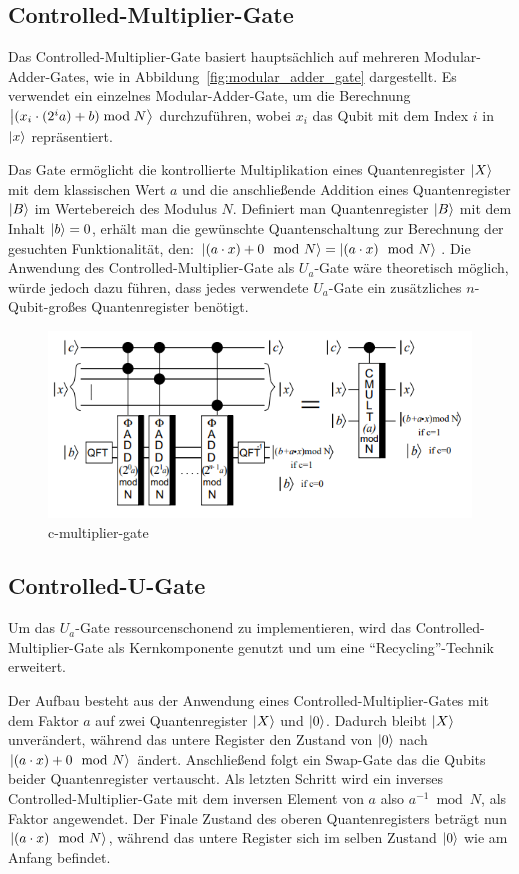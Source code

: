 \documentclass[a4paper,journal]{IEEEtran}
\begin{document}
\subsection{Controlled-Multiplier-Gate}
Das Controlled-Multiplier-Gate basiert hauptsächlich auf mehreren Modular-Adder-Gates,
wie in Abbildung~\ref{fig:modular_adder_gate} dargestellt.
Es verwendet ein einzelnes Modular-Adder-Gate,
um die Berechnung \(\ket{(x_i\cdot(2^ia)+b) \bmod N}\) durchzuführen,
wobei \(x_i\) das Qubit mit dem Index \(i\) in \(\ket{x}\) repräsentiert.

Das Gate ermöglicht die kontrollierte Multiplikation
eines Quantenregister \(\ket{X}\) mit dem klassischen Wert \(a\) und
die anschließende Addition eines Quantenregister \(\ket{B}\) im Wertebereich des Modulus \(N\).
Definiert man Quantenregister \(\ket{B}\) mit dem Inhalt \(\ket{b} = 0\),
erhält man die gewünschte Quantenschaltung zur Berechnung der gesuchten Funktionalität, den:
\(\ket{(a \cdot x) + 0\mod N} = \ket{(a \cdot x)\mod N}\).
Die Anwendung des Controlled-Multiplier-Gate als \(U_a\)-Gate wäre theoretisch möglich,
würde jedoch dazu führen, dass jedes verwendete \(U_a\)-Gate ein
zusätzliches \(n\)-Qubit-großes Quantenregister benötigt.
\begin{figure}[!h]
\caption{c-multiplier-gate~\cite{beauregard2003circuit}}
\label{fig:c-multiplier-gate}
\includegraphics[width=\linewidth]{c-multiplier-gate.PNG}
\centering
\end{figure}

\subsection{Controlled-U-Gate}
Um das \(U_a\)-Gate ressourcenschonend zu implementieren,
wird das Controlled-Multiplier-Gate als Kernkomponente genutzt und um eine "`Recycling"'-Technik erweitert.

Der Aufbau besteht aus der Anwendung eines Controlled-Multiplier-Gates
mit dem Faktor \(a\) auf zwei Quantenregister \(\ket{X}\) und \(\ket{0}\).
Dadurch bleibt \(\ket{X}\) unverändert,
während das untere Register den Zustand von \(\ket{0}\) nach \(\ket{(a \cdot x) + 0\mod N}\) ändert.
Anschließend folgt ein Swap-Gate das die Qubits beider Quantenregister vertauscht.
Als letzten Schritt wird ein inverses Controlled-Multiplier-Gate
mit dem inversen Element von \(a\) also \(a^{-1} \bmod N\),
als Faktor angewendet.
Der Finale Zustand des oberen Quantenregisters beträgt nun \(\ket{(a \cdot x) \mod N}\),
während das untere Register sich im selben Zustand \(\ket{0}\) wie am Anfang befindet.
\end{document}
